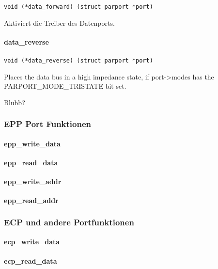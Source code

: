 \documentclass[a4paper,11pt]{article}
\begin{document}
\begin{verbatim}
void (*data_forward) (struct parport *port)
\end{verbatim}

Aktiviert die Treiber des Datenports.

\paragraph{data\_reverse}

\begin{verbatim}
void (*data_reverse) (struct parport *port)
\end{verbatim}

Places the data bus in a high impedance state, if port->modes has the
PARPORT\_MODE\_TRISTATE bit set.

Blubb?

\subsubsection{EPP Port Funktionen}

\paragraph{epp\_write\_data}

\paragraph{epp\_read\_data}

\paragraph{epp\_write\_addr}

\paragraph{epp\_read\_addr}

\subsubsection{ECP und andere Portfunktionen}

\paragraph{ecp\_write\_data}

\paragraph{ecp\_read\_data}
\end{document}
